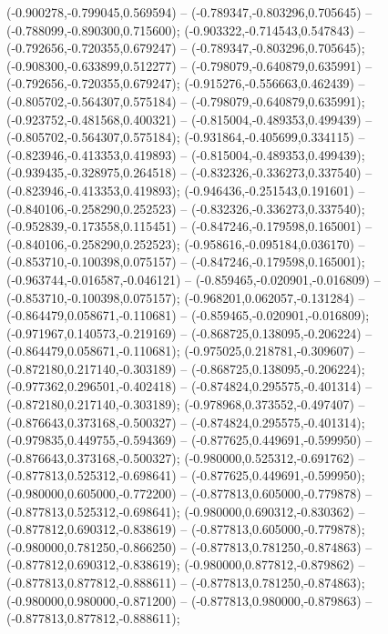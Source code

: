  (-0.900278,-0.799045,0.569594) -- (-0.789347,-0.803296,0.705645) -- (-0.788099,-0.890300,0.715600);
 (-0.903322,-0.714543,0.547843) -- (-0.792656,-0.720355,0.679247) -- (-0.789347,-0.803296,0.705645);
 (-0.908300,-0.633899,0.512277) -- (-0.798079,-0.640879,0.635991) -- (-0.792656,-0.720355,0.679247);
 (-0.915276,-0.556663,0.462439) -- (-0.805702,-0.564307,0.575184) -- (-0.798079,-0.640879,0.635991);
 (-0.923752,-0.481568,0.400321) -- (-0.815004,-0.489353,0.499439) -- (-0.805702,-0.564307,0.575184);
 (-0.931864,-0.405699,0.334115) -- (-0.823946,-0.413353,0.419893) -- (-0.815004,-0.489353,0.499439);
 (-0.939435,-0.328975,0.264518) -- (-0.832326,-0.336273,0.337540) -- (-0.823946,-0.413353,0.419893);
 (-0.946436,-0.251543,0.191601) -- (-0.840106,-0.258290,0.252523) -- (-0.832326,-0.336273,0.337540);
 (-0.952839,-0.173558,0.115451) -- (-0.847246,-0.179598,0.165001) -- (-0.840106,-0.258290,0.252523);
 (-0.958616,-0.095184,0.036170) -- (-0.853710,-0.100398,0.075157) -- (-0.847246,-0.179598,0.165001);
 (-0.963744,-0.016587,-0.046121) -- (-0.859465,-0.020901,-0.016809) -- (-0.853710,-0.100398,0.075157);
 (-0.968201,0.062057,-0.131284) -- (-0.864479,0.058671,-0.110681) -- (-0.859465,-0.020901,-0.016809);
 (-0.971967,0.140573,-0.219169) -- (-0.868725,0.138095,-0.206224) -- (-0.864479,0.058671,-0.110681);
 (-0.975025,0.218781,-0.309607) -- (-0.872180,0.217140,-0.303189) -- (-0.868725,0.138095,-0.206224);
 (-0.977362,0.296501,-0.402418) -- (-0.874824,0.295575,-0.401314) -- (-0.872180,0.217140,-0.303189);
 (-0.978968,0.373552,-0.497407) -- (-0.876643,0.373168,-0.500327) -- (-0.874824,0.295575,-0.401314);
 (-0.979835,0.449755,-0.594369) -- (-0.877625,0.449691,-0.599950) -- (-0.876643,0.373168,-0.500327);
 (-0.980000,0.525312,-0.691762) -- (-0.877813,0.525312,-0.698641) -- (-0.877625,0.449691,-0.599950);
 (-0.980000,0.605000,-0.772200) -- (-0.877813,0.605000,-0.779878) -- (-0.877813,0.525312,-0.698641);
 (-0.980000,0.690312,-0.830362) -- (-0.877812,0.690312,-0.838619) -- (-0.877813,0.605000,-0.779878);
 (-0.980000,0.781250,-0.866250) -- (-0.877813,0.781250,-0.874863) -- (-0.877812,0.690312,-0.838619);
 (-0.980000,0.877812,-0.879862) -- (-0.877813,0.877812,-0.888611) -- (-0.877813,0.781250,-0.874863);
 (-0.980000,0.980000,-0.871200) -- (-0.877813,0.980000,-0.879863) -- (-0.877813,0.877812,-0.888611);
